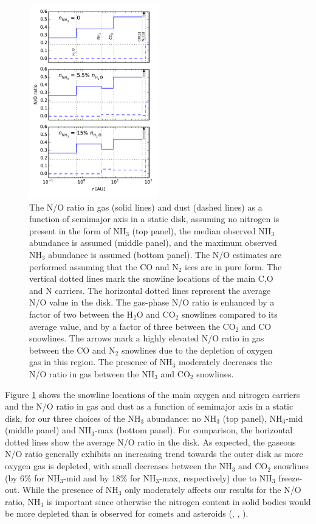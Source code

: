 \documentclass[apj]{emulateapj}
\begin{document}
\begin{figure}[h!]
\centering
\includegraphics[width=0.5\textwidth]{N_O_ratio.pdf}
\caption{The N/O ratio in gas (solid lines) and dust (dashed lines) as a function of semimajor axis in a static disk, assuming no nitrogen is present in the form of NH$_3$ (top panel), the median observed NH$_3$ abundance is assumed (middle panel), and the maximum observed NH$_3$ abundance is assumed (bottom panel). The N/O estimates are performed assuming that the CO and N$_2$ ices are in pure form. The vertical dotted lines mark the snowline locations of the main C,O and N carriers. The horizontal dotted lines represent the average N/O value in the disk. The gas-phase N/O ratio is enhanced by a factor of two between the H$_2$O and CO$_2$ snowlines compared to its average value, and by a factor of three between the CO$_2$ and CO snowlines. The arrows mark a highly elevated N/O ratio in gas between the CO and N$_2$ snowlines due to the depletion of oxygen gas in this region. The presence of NH$_3$ moderately decreases the N/O ratio in gas between the NH$_3$ and CO$_2$ snowlines.} 
\label{fig:Nstatic}
\end{figure}

Figure \ref{fig:Nstatic} shows the snowline locations of the main oxygen and nitrogen carriers and the N/O ratio in gas and dust as a function of semimajor axis in a static disk, for our three choices of the NH$_3$ abundance: no NH$_3$ (top panel), NH$_3$-mid (middle panel) and NH$_3$-max (bottom panel). For comparison, the horizontal dotted lines show the average N/O ratio in the disk. As expected, the gaseous N/O ratio generally exhibits an increasing trend towards the outer disk as more oxygen gas is depleted, with small decreases between the NH$_3$ and CO$_2$ snowlines (by 6\% for NH$_3$-mid and by 18\% for NH$_3$-max, respectively) due to NH$_3$ freeze-out. While the presence of NH$_3$ only moderately affects our results for the N/O ratio, NH$_3$ is important since otherwise the nitrogen content in solid bodies would be more depleted than is observed for comets and asteroids (\citealt{wyckoff91}, \citealt{mumma11}, \citealt{bergin15}).
\end{document}
